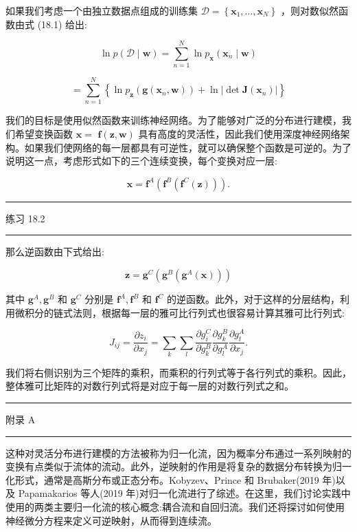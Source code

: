 \documentclass[10pt]{article}
\newcommand{\HRule}{\begin{center}\rule{0.9\linewidth}{0.2mm}\end{center}}
\begin{document}
如果我们考虑一个由独立数据点组成的训练集 \(\mathcal{D} = \left\{  {{\mathbf{x}}_{1},\ldots ,{\mathbf{x}}_{N}}\right\}\) ，则对数似然函数由式 (18.1) 给出:

\[
\ln p\left( {\mathcal{D} \mid  \mathbf{w}}\right)  = \mathop{\sum }\limits_{{n = 1}}^{N}\ln {p}_{\mathbf{x}}\left( {{\mathbf{x}}_{n} \mid  \mathbf{w}}\right)  \tag{18.3}
\]

\[
= \mathop{\sum }\limits_{{n = 1}}^{N}\left\{  {\ln {p}_{\mathbf{z}}\left( {\mathbf{g}\left( {{\mathbf{x}}_{n},\mathbf{w}}\right) }\right)  + \ln \left| {\det \mathbf{J}\left( {\mathbf{x}}_{n}\right) }\right| }\right\}   \tag{18.4}
\]

我们的目标是使用似然函数来训练神经网络。为了能够对广泛的分布进行建模，我们希望变换函数 \(\mathbf{x} =\)  \(\mathbf{f}\left( {\mathbf{z},\mathbf{w}}\right)\) 具有高度的灵活性，因此我们使用深度神经网络架构。如果我们使网络的每一层都具有可逆性，就可以确保整个函数是可逆的。为了说明这一点，考虑形式如下的三个连续变换，每个变换对应一层:

\[
\mathbf{x} = {\mathbf{f}}^{A}\left( {{\mathbf{f}}^{B}\left( {{\mathbf{f}}^{C}\left( \mathbf{z}\right) }\right) }\right) . \tag{18.5}
\]

\HRule

练习 18.2

\HRule

那么逆函数由下式给出:

\[
\mathbf{z} = {\mathbf{g}}^{C}\left( {{\mathbf{g}}^{B}\left( {{\mathbf{g}}^{A}\left( \mathbf{x}\right) }\right) }\right)  \tag{18.6}
\]

其中 \({\mathbf{g}}^{A},{\mathbf{g}}^{B}\) 和 \({\mathbf{g}}^{C}\) 分别是 \({\mathbf{f}}^{A},{\mathbf{f}}^{B}\) 和 \({\mathbf{f}}^{C}\) 的逆函数。此外，对于这样的分层结构，利用微积分的链式法则，根据每一层的雅可比行列式也很容易计算其雅可比行列式:

\[
{J}_{ij} = \frac{\partial {z}_{i}}{\partial {x}_{j}} = \mathop{\sum }\limits_{k}\mathop{\sum }\limits_{l}\frac{\partial {g}_{i}^{C}}{\partial {g}_{k}^{B}}\frac{\partial {g}_{k}^{B}}{\partial {g}_{l}^{A}}\frac{\partial {g}_{l}^{A}}{\partial {x}_{j}}. \tag{18.7}
\]

我们将右侧识别为三个矩阵的乘积，而乘积的行列式等于各行列式的乘积。因此，整体雅可比矩阵的对数行列式将是对应于每一层的对数行列式之和。

\HRule

附录 A

\HRule

这种对灵活分布进行建模的方法被称为归一化流，因为概率分布通过一系列映射的变换有点类似于流体的流动。此外，逆映射的作用是将复杂的数据分布转换为归一化形式，通常是高斯分布或正态分布。Kobyzev、Prince 和 Brubaker(2019 年)以及 Papamakarios 等人(2019 年)对归一化流进行了综述。在这里，我们讨论实践中使用的两类主要归一化流的核心概念:耦合流和自回归流。我们还将探讨如何使用神经微分方程来定义可逆映射，从而得到连续流。
\end{document}

